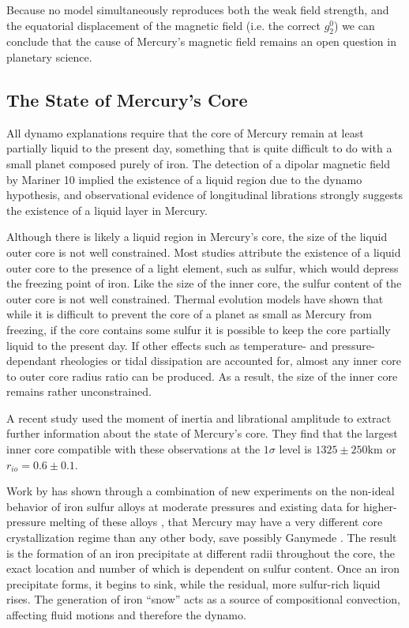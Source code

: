 Because no model simultaneously reproduces both the weak field strength, and the equatorial displacement of the magnetic field (i.e. the correct $g_2^0$) we can conclude that the cause of Mercury's magnetic field remains an open question in planetary science.

\subsection{The State of Mercury's Core}

All dynamo explanations require that the core of Mercury remain at least partially liquid to the present day, something that is quite difficult to do with a small planet composed purely of iron. The detection of a dipolar magnetic field by Mariner 10 implied the existence of a liquid region due to the dynamo hypothesis, and observational evidence of longitudinal librations \citep{margot2007, margot2012} strongly suggests the existence of a liquid layer in Mercury. 

Although there is likely a liquid region in Mercury's core, the size of the liquid outer core is not well constrained. Most studies attribute the existence of a liquid outer core to the presence of a light element, such as sulfur, which would depress the freezing point of iron. Like the size of the inner core, the sulfur content of the outer core is not well constrained. Thermal evolution models \citep{schubertandross88} have shown that while it is difficult to prevent the core of a planet as small as Mercury from freezing, if the core contains some sulfur it is possible to keep the core partially liquid to the present day. If other effects such as temperature- and pressure-dependant rheologies \citep{conzelmann99,hauck04,brueur07} or tidal dissipation \citep{schubertandross88} are accounted for, almost any inner core to outer core radius ratio can be produced. As a result, the size of the inner core remains rather unconstrained. 

A recent study \citet{dumberry2015} used the moment of inertia and librational amplitude to extract further information about the state of Mercury's core. They find that the largest inner core compatible with these observations at the $1\sigma$ level is $1325 \pm 250\textrm{km}$ or $r_{io}=0.6\pm 0.1$.

Work by \citet{chenetal2008} has shown through a combination of new experiments on the non-ideal behavior of iron sulfur alloys at moderate pressures and existing data for higher-pressure melting of these alloys \citep{stewart07}, that Mercury may have a very different core crystallization regime than any other body, save possibly Ganymede \citep{hauck06}. The result is the formation of an iron precipitate at different radii throughout the core, the exact location and number of which is dependent on sulfur content. Once an iron precipitate forms, it begins to sink, while the residual, more sulfur-rich liquid rises. The generation of iron ``snow'' acts as a source of compositional convection, affecting fluid motions and therefore the dynamo.

